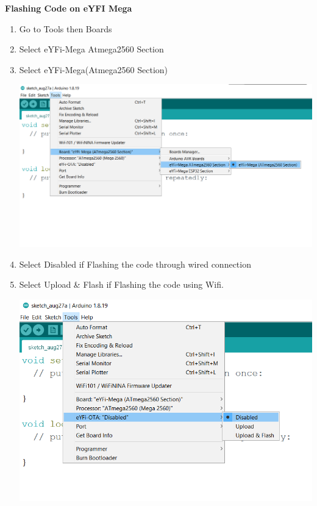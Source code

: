 \documentclass[12pt,a4paper,oneside]{book}
\begin{document}
    \begin{huge}
    \textbf{Flashing Code on eYFI Mega}
    \end{huge}
    \begin{enumerate}
        \item Go to Tools then Boards
        \item Select eYFi-Mega Atmega2560 Section
        \item Select eYFi-Mega(Atmega2560 Section)
            \begin{center}
            \includegraphics[scale=0.4]{SELECTING EYFI BOARD.png}
            \end{center}
        \item Select Disabled if Flashing the code through wired connection
        \item Select Upload \& Flash if Flashing the code using Wifi.
        \begin{center}
            \includegraphics[scale=0.6]{eYFi OTA.png}
        \end{center}
    \end{enumerate}
    
\end{document}
